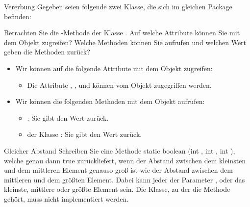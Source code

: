 \documentclass{../preamble}
\begin{document}
\clearpage

\begin{task}[credit = \stars{1}{3}]{Vererbung}
    Gegeben seien folgende zwei Klasse, die sich im gleichen Package befinden:
    
    Betrachten Sie die -Methode der Klasse . Auf welche Attribute können Sie mit dem Objekt  zugreifen? Welche Methoden können Sie aufrufen und welchen Wert geben die Methoden zurück?

    \begin{solution}
        \begin{itemize}
            \item Wir können auf die folgende Attribute mit dem Objekt  zugreifen:
                  \begin{itemize}
                      \item Die Attribute , ,  und  können vom Objekt  zugegriffen werden.
                  \end{itemize}
            \item Wir können die folgenden Methoden mit dem Objekt  aufrufen:
                  \begin{itemize}
                      \item {}: Sie  gibt den Wert  zurück.
                      \item {} der Klasse : Sie gibt den Wert  zurück.
                  \end{itemize}
        \end{itemize}
    \end{solution}
\end{task}

\clearpage

\begin{task}[credit = \stars{2}{3}]{Gleicher Abstand}
    Schreiben Sie eine Methode \textcolor{keywordcolor}{static} \textcolor{keywordcolor}{boolean} (\textcolor{keywordcolor}{int} , \textcolor{keywordcolor}{int} , \textcolor{keywordcolor}{int} ), welche genau dann \textcolor{keywordcolor}{true} zurückliefert,  wenn der Abstand zwischen dem kleinsten und dem mittleren Element genauso groß ist wie der Abstand zwischen dem mittleren und dem größten Element. Dabei kann jeder der Parameter ,  oder  das kleinste, mittlere oder größte Element sein. Die Klasse, zu der die Methode gehört, muss nicht implementiert werden.

    \begin{solution}
        
    \end{solution}
\end{task}
\end{document}
